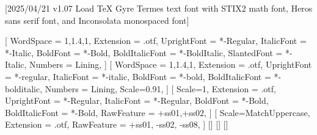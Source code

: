 
[2025/04/21 v1.07 Load TeX Gyre Termes text font with STIX2 math font, Heros sans serif font, and Inconsolata monospaced font]

%
%
\ifpdftex
	\RequirePackage[T1]{fontenc}	
	\RequirePackage{bm}
\else
    \RequirePackage[warnings-off={mathtools-colon,mathtools-overbracket}]{unicode-math}
    \setmainfont{TeXGyreTermesX}[
		WordSpace = {1,1.4,1},%
    	Extension = .otf,
    	UprightFont = *-Regular,
    	ItalicFont = *-Italic,
    	BoldFont = *-Bold,
    	BoldItalicFont = *-BoldItalic,
		SlantedFont = *-Italic,
		Numbers = Lining,
	]
	\setsansfont{texgyreheros}[
		WordSpace = {1,1.4,1},
		Extension = .otf,
    	UprightFont = *-regular,
    	ItalicFont = *-italic,
    	BoldFont = *-bold,
    	BoldItalicFont = *-bolditalic,
		Numbers = Lining,
    	Scale=0.91,%
	]        
	\setmonofont{Inconsolatazi4}[
        Scale=1,%
        Extension = .otf,
        UprightFont = *-Regular,
        ItalicFont = *-Regular,%
        BoldFont = *-Bold, 
    	BoldItalicFont = *-Bold,%
        RawFeature = {+ss01,+ss02}, %
    ]             
	[%
    	Scale=MatchUppercase,
    	Extension = .otf,
    	RawFeature = {+ss01, -ss02, -ss08},
   ]
   \setmathfontface{}[]%
   \setmathfontface{}[]
   \setmathfontface{}[]%
   \newcommand*{\FRAC}[1]{{\addfontfeature{Fractions=On}#1}}%
\fi
